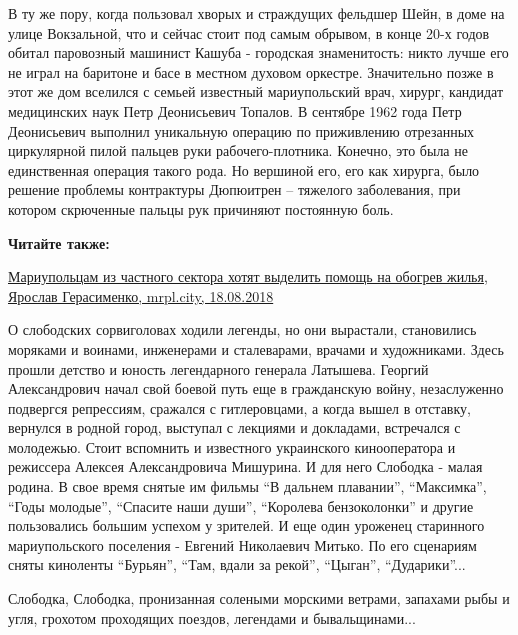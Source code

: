 В ту же пору, когда пользовал хворых и страждущих фельдшер Шейн, в доме на
улице Вокзальной, что и сейчас стоит под самым обрывом, в конце 20-х годов
обитал паровозный машинист Кашуба - городская знаменитость: никто лучше его не
играл на баритоне и басе в местном духовом оркестре. Значительно позже в этот
же дом вселился с семьей известный мариупольский врач, хирург, кандидат
медицинских наук Петр Деонисьевич Топалов. В сентябре 1962 года Петр
Деонисьевич выполнил уникальную операцию по приживлению отрезанных циркулярной
пилой пальцев руки рабочего-плотника. Конечно, это была не единственная
операция такого рода. Но вершиной его, его как хирурга, было решение проблемы
контрактуры Дюпюитрен – тяжелого заболевания, при котором скрюченные пальцы рук
причиняют постоянную боль.

\textbf{Читайте также:} 

\href{https://mrpl.city/news/view/mariupoltsam-iz-chastnogo-sektora-hotyat-vydelit-pomoshh-na-obogrev-zhilya-foto}{%
Мариупольцам из частного сектора хотят выделить помощь на обогрев жилья, Ярослав Герасименко, mrpl.city, 18.08.2018}

О слободских сорвиголовах ходили легенды, но они вырастали, становились
моряками и воинами, инженерами и сталеварами, врачами и художниками. Здесь
прошли детство и юность легендарного генерала Латышева. Георгий Александрович
начал свой боевой путь еще в гражданскую войну, незаслуженно подвергся
репрессиям, сражался с гитлеровцами, а когда вышел в отставку, вернулся в
родной город, выступал с лекциями и докладами, встречался с молодежью. Стоит
вспомнить и известного украинского кинооператора и режиссера Алексея
Александровича Мишурина. И для него Слободка - малая родина. В свое время
снятые им фильмы \enquote{В дальнем плавании}, \enquote{Максимка},
\enquote{Годы молодые}, \enquote{Спасите наши души}, \enquote{Королева
бензоколонки} и другие пользовались большим успехом у зрителей. И еще один
уроженец старинного мариупольского поселения - Евгений Николаевич Митько. По
его сценариям сняты киноленты \enquote{Бурьян}, \enquote{Там, вдали за рекой},
\enquote{Цыган}, \enquote{Дударики}...

Слободка, Слободка, пронизанная солеными морскими ветрами, запахами рыбы и
угля, грохотом проходящих поездов, легендами и бывальщинами...
